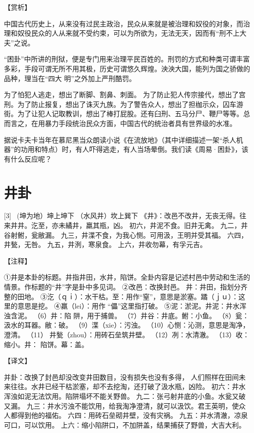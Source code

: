 \documentclass[12pt,UTF8]{ctexbook}
\begin{document}
【赏析】

中国古代历史上，从来没有过民主政治，民众从来就是被治理和奴役的对象，而治理和奴役民众的人从来就不受约束，可以为所欲为，无法无天，因而有“刑不上大夫”之说。

“困卦”中所讲的刑狱，便是专门用来治理平民百姓的。刑罚的方式和种类可谓丰富多彩，手段可谓无所不用其极，历史可谓悠久辉煌。泱泱大国，能列为国之骄做的品种，理当在“四大 明”之外加上严刑酷罚。

为了怕犯人逃走，想出了断脚、割鼻、刺面。 为了防止犯人传宗接代，想出了宫刑。为了防止报复，想出了诛灭九族。为了警告众人，想出了担枷示众，囚车游街。为了让犯人记取教训，想出了棒打屁股。还有臼刑、五马分尸、鞭尸等等。总而言之，在用暴力手段统治民众方面，中国古代的统治者具有世界级的水准。

据说卡夫卡当年在慕尼黑当众朗读小说《在流放地》（其中详细描述一架“杀人机器”的功用和特点）时，有人吓得逃走，有人当场晕倒。我们读《周易·困卦》，该有什么反应呢？

\chapter{井卦}
[3] \ (坤为地）坤上坤下
（水风井）坎上巽下
《井》：改邑不改井，无丧无得。往来井井。汔至，亦未繘井，羸其瓶，凶。
初六，井泥不食。旧井无禽。
九二，井谷射鲋，瓮敝漏。
九三，井渫不食，为我心恻。可用汲，王明并受其福。
六四，井甃，无咎。
九五，井洌，寒泉食。
上六，井收勿幕，有孚元吉。

【注释】

①井是本卦的标题。井指井田，水井，陷饼。全卦内容是记述村邑中劳动和生活的情景。作标题的“井”字是卦中多见词。
②改邑：改换封邑。 井：井田，指划分齐整的田地。
③汔（ｑｉ）：水干枯。至：用作“窒”，意思是淤塞。蹫（ｊｕ）：这里的意思是挖。
④羸（lei）：用作 “儡”这里指打破。
⑤泥：淤泥。井泥：井水浑浊含泥。
（6）井：陷 阱，用于捕兽。
（7）井谷：井底。鲋：小鱼。
（8）瓮：汲水的耳器。敝：破。
（9）渫（xie）：污浊。
（10）心恻：沁测，意思是淘净，澄清。
（11） 井甃（zhou）：用砖石垒筑井壁。
（12）冽：水清澈。
（13）收：缩小。井： 陷饼。幕：盖。

【译文】

并卦：改换了封邑却没改变井田数目，没有损失也没有多得， 人们照样在田间未来往往。水井已经干枯淤塞，却不去挖淘，还打破了汲水瓶，凶险。
初六：井水浑浊如泥无法饮用。陷阱塌坏不能关野兽。
九二：张弓射井底的小鱼。水瓮又破又漏。
九三：井水污浊不能饮用，给我淘净澄清，就可以汲饮。君王英明，使众人都得到他的福佑。
六四：用砖石垒砌井壁，没有灾祸。
九五：并水清澈，凉泉可口，可以饮用。
上六：缩小陷阱口，不加阱盖，结果捕获了野兽，大吉大利。
\end{document}
